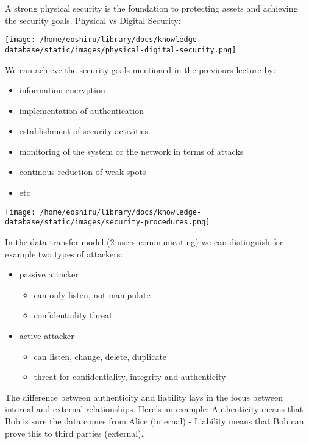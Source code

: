 \documentclass[11pt]{article}
\begin{document}
A strong physical security is the foundation to protecting assets and achieving the security goals. Physical vs Digital Security:\\
\begin{center}
\texttt{[image: /home/eoshiru/library/docs/knowledge-database/static/images/physical-digital-security.png]}
\end{center}
We can achieve the security goals mentioned in the previours lecture by:
\begin{itemize}
\item information encryption
\item implementation of authentication
\item establishment of security activities
\item monitoring of the system or the network in terms of attacks
\item continous reduction of weak spots
\item etc
\end{itemize}

\begin{center}
\texttt{[image: /home/eoshiru/library/docs/knowledge-database/static/images/security-procedures.png]}
\end{center}

In the data transfer model (2 users communicating) we can distinguish for example two types of attackers:
\begin{itemize}
\item passive attacker
\begin{itemize}
\item can only listen, not manipulate
\item confidentiality threat
\end{itemize}
\item active attacker
\begin{itemize}
\item can listen, change, delete, duplicate
\item threat for confidentiality, integrity and authenticity
\end{itemize}
\end{itemize}

The difference between authenticity and liability lays in the focus between internal and external relationships. Here's an example: Authenticity means that Bob is sure the data comes from Alice (internal) - Liability means that Bob can prove this to third parties (external).
\end{document}
